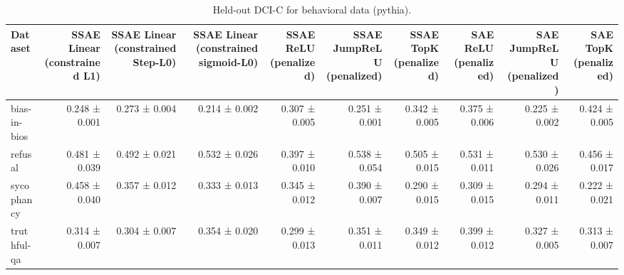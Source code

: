 \begin{table}[t]
\centering
\caption{Held-out DCI-C for behavioral data (pythia).}
\label{tab:behavioral-pythia-dci-c}
\begin{tabular}{lrrrrrrrrr}
\toprule
Dataset & SSAE Linear (constrained L1) & SSAE Linear (constrained Step-L0) & SSAE Linear (constrained sigmoid-L0) & SSAE ReLU (penalized) & SSAE JumpReLU (penalized) & SSAE TopK (penalized) & SAE ReLU (penalized) & SAE JumpReLU (penalized) & SAE TopK (penalized) \\
\midrule
bias-in-bios & 0.248 ± 0.001 & 0.273 ± 0.004 & 0.214 ± 0.002 & 0.307 ± 0.005 & 0.251 ± 0.001 & 0.342 ± 0.005 & 0.375 ± 0.006 & 0.225 ± 0.002 & 0.424 ± 0.005 \\
refusal & 0.481 ± 0.039 & 0.492 ± 0.021 & 0.532 ± 0.026 & 0.397 ± 0.010 & 0.538 ± 0.054 & 0.505 ± 0.015 & 0.531 ± 0.011 & 0.530 ± 0.026 & 0.456 ± 0.017 \\
sycophancy & 0.458 ± 0.040 & 0.357 ± 0.012 & 0.333 ± 0.013 & 0.345 ± 0.012 & 0.390 ± 0.007 & 0.290 ± 0.015 & 0.309 ± 0.015 & 0.294 ± 0.011 & 0.222 ± 0.021 \\
truthful-qa & 0.314 ± 0.007 & 0.304 ± 0.007 & 0.354 ± 0.020 & 0.299 ± 0.013 & 0.351 ± 0.011 & 0.349 ± 0.012 & 0.399 ± 0.012 & 0.327 ± 0.005 & 0.313 ± 0.007 \\
\bottomrule
\end{tabular}
\end{table}
